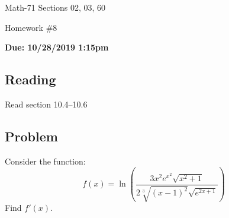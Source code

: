 \documentclass[letterpaper,12pt,fleqn]{article}
\begin{document}
\begin{center}
  \large
  Math-71 Sections 02, 03, 60

  \Large
  Homework \#8

  \large
  \textbf{Due: 10/28/2019 1:15pm}
\end{center}

\subsection*{Reading}

Read section 10.4--10.6

\subsection*{Problem}

Consider the function:
\[f(x)=\ln\left(\frac{3x^2e^{x^2}\sqrt{x^2+1}}{2\sqrt[3]{(x-1)^2}\sqrt{e^{2x+1}}}\right)\]
Find \(f'(x)\).
\end{document}
